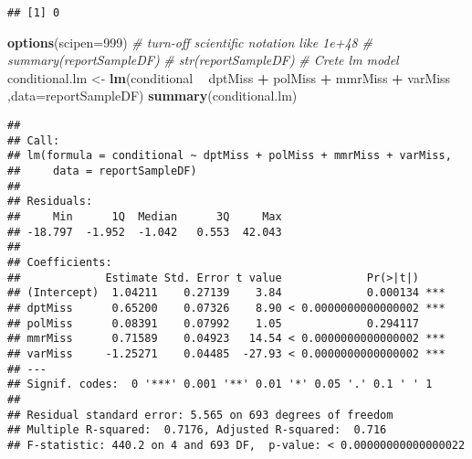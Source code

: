 \documentclass[]{article}
\newenvironment{Shaded}{\begin{snugshade}}{\end{snugshade}}
\newcommand{\CommentTok}[1]{\textcolor[rgb]{0.56,0.35,0.01}{\textit{#1}}}
\newcommand{\DataTypeTok}[1]{\textcolor[rgb]{0.13,0.29,0.53}{#1}}
\newcommand{\DecValTok}[1]{\textcolor[rgb]{0.00,0.00,0.81}{#1}}
\newcommand{\KeywordTok}[1]{\textcolor[rgb]{0.13,0.29,0.53}{\textbf{#1}}}
\newcommand{\NormalTok}[1]{#1}
\newcommand{\OperatorTok}[1]{\textcolor[rgb]{0.81,0.36,0.00}{\textbf{#1}}}
\newcommand{\StringTok}[1]{\textcolor[rgb]{0.31,0.60,0.02}{#1}}
\begin{document}
\begin{verbatim}
## [1] 0
\end{verbatim}

\begin{Shaded}
\begin{Highlighting}[]
\KeywordTok{options}\NormalTok{(}\DataTypeTok{scipen=}\DecValTok{999}\NormalTok{)  }\CommentTok{# turn-off scientific notation like 1e+48}
\CommentTok{# summary(reportSampleDF)}
\CommentTok{# str(reportSampleDF)}
\CommentTok{# Crete lm model}
\NormalTok{conditional.lm <-}\StringTok{ }\KeywordTok{lm}\NormalTok{(conditional }\OperatorTok{~}\StringTok{ }\NormalTok{dptMiss }\OperatorTok{+}\StringTok{ }\NormalTok{polMiss }\OperatorTok{+}\StringTok{ }\NormalTok{mmrMiss }\OperatorTok{+}\StringTok{ }\NormalTok{varMiss ,}\DataTypeTok{data=}\NormalTok{reportSampleDF) }
\KeywordTok{summary}\NormalTok{(conditional.lm)}
\end{Highlighting}
\end{Shaded}

\begin{verbatim}
## 
## Call:
## lm(formula = conditional ~ dptMiss + polMiss + mmrMiss + varMiss, 
##     data = reportSampleDF)
## 
## Residuals:
##     Min      1Q  Median      3Q     Max 
## -18.797  -1.952  -1.042   0.553  42.043 
## 
## Coefficients:
##             Estimate Std. Error t value             Pr(>|t|)    
## (Intercept)  1.04211    0.27139    3.84             0.000134 ***
## dptMiss      0.65200    0.07326    8.90 < 0.0000000000000002 ***
## polMiss      0.08391    0.07992    1.05             0.294117    
## mmrMiss      0.71589    0.04923   14.54 < 0.0000000000000002 ***
## varMiss     -1.25271    0.04485  -27.93 < 0.0000000000000002 ***
## ---
## Signif. codes:  0 '***' 0.001 '**' 0.01 '*' 0.05 '.' 0.1 ' ' 1
## 
## Residual standard error: 5.565 on 693 degrees of freedom
## Multiple R-squared:  0.7176, Adjusted R-squared:  0.716 
## F-statistic: 440.2 on 4 and 693 DF,  p-value: < 0.00000000000000022
\end{verbatim}

\begin{Shaded}
\end{Shaded}
\end{document}
